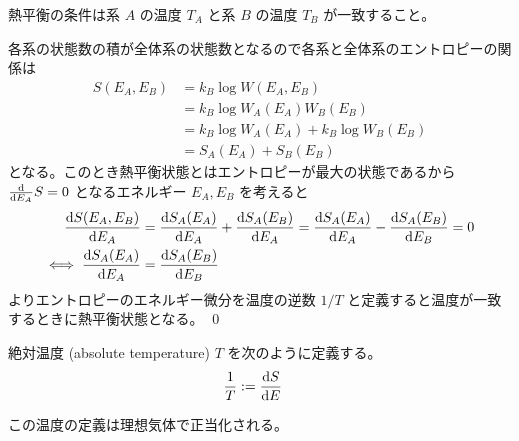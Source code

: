 \documentclass[uplatex,diffipdfmx,a4paper,11pt]{jlreq}
\makeatletter
\numberwithin{equation}{section}
\theoremstyle{definition}
\renewenvironment{proof}[1][\proofname]{\par
  \normalfont
  \topsep6\p@\@plus6\p@ \trivlist
  \item[\hskip\labelsep{\bfseries #1}\@addpunct{\bfseries}]\ignorespaces\quad\par
}{%
  \qed\endtrivlist\@endpefalse
}
\renewcommand\proofname{証明}
\makeatother
\begin{document}
\begin{theorem}
  熱平衡の条件は系 $A$ の温度 $T_A$ と系 $B$ の温度 $T_B$ が一致すること。
\end{theorem}
\begin{proof}
  各系の状態数の積が全体系の状態数となるので各系と全体系のエントロピーの関係は
  \begin{align}
    S(E_A, E_B) & = k_B\log W(E_A, E_B)                 \\
                & = k_B\log W_A(E_A)W_B(E_B)            \\
                & = k_B\log W_A(E_A) + k_B\log W_B(E_B) \\
                & = S_A(E_A) + S_B(E_B)
  \end{align}
  となる。このとき熱平衡状態とはエントロピーが最大の状態であるから $\diff*{S}{E_A} = 0$ となるエネルギー $E_A, E_B$ を考えると
  \begin{align}
    \diff{S(E_A, E_B)}{E_A}   & = \diff{S_A(E_A)}{E_A} + \diff{S_A(E_B)}{E_A} = \diff{S_A(E_A)}{E_A} - \diff{S_A(E_B)}{E_B} = 0 \\
    \iff \diff{S_A(E_A)}{E_A} & = \diff{S_A(E_B)}{E_B}
  \end{align}
  よりエントロピーのエネルギー微分を温度の逆数 $1/T$ と定義すると温度が一致するときに熱平衡状態となる。
\end{proof}

\begin{definition}
  絶対温度 (absolute temperature) $T$ を次のように定義する。
  \begin{align}
    \frac{1}{T} & := \diff{S}{E}
  \end{align}
\end{definition}

この温度の定義は理想気体で正当化される。
\end{document}

